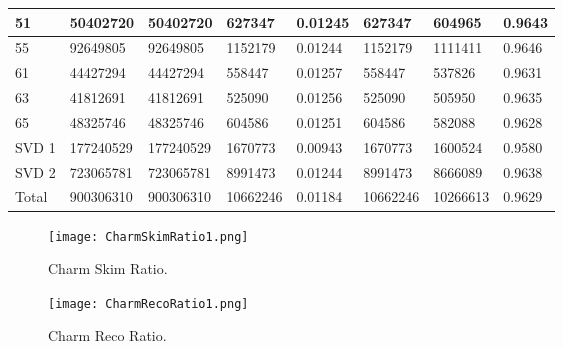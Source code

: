\documentclass[11pt]{article}
\begin{document}
\begin{tabular}{ | l || l | l | l | l || l | l | l |}
  51&50402720&50402720&627347&0.01245&627347&604965&0.9643\\\hline
  55&92649805&92649805&1152179&0.01244&1152179&1111411&0.9646\\\hline
  61&44427294&44427294&558447&0.01257&558447&537826&0.9631\\\hline
  63&41812691&41812691&525090&0.01256&525090&505950&0.9635\\\hline
  65&48325746&48325746&604586&0.01251&604586&582088&0.9628\\\hline
  \hline
  SVD 1&177240529&177240529&1670773&0.00943&1670773&1600524&0.9580\\\hline
  SVD 2&723065781&723065781&8991473&0.01244&8991473&8666089&0.9638\\\hline
  Total&900306310&900306310&10662246&0.01184&10662246&10266613&0.9629\\\hline
\end{tabular}

\begin{figure}[!htb]
  \centering
  \begin{minipage}[b]{0.4\textwidth}
    \texttt{[image: CharmSkimRatio1.png]}
    \caption{Charm Skim Ratio.}
  \end{minipage}
  \hfill
  \begin{minipage}[b]{0.4\textwidth}
    \texttt{[image: CharmRecoRatio1.png]}
    \caption{Charm Reco Ratio.}
  \end{minipage}
\end{figure}
\end{document}
